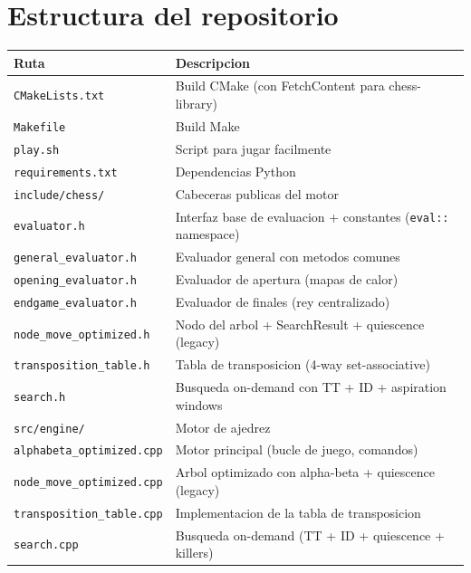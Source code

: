 \documentclass[11pt,a4paper]{article}
\begin{document}
\section{Estructura del repositorio}

\begin{center}
\small
\begin{tabularx}{\textwidth}{@{}l X@{}}
\toprule
\textbf{Ruta} & \textbf{Descripcion} \\
\midrule
\texttt{CMakeLists.txt} & Build CMake (con FetchContent para chess-library) \\
\texttt{Makefile} & Build Make \\
\texttt{play.sh} & Script para jugar facilmente \\
\texttt{requirements.txt} & Dependencias Python \\
\midrule
\texttt{include/chess/} & Cabeceras publicas del motor \\
\quad \texttt{evaluator.h} & Interfaz base de evaluacion + constantes (\texttt{eval::} namespace) \\
\quad \texttt{general\_evaluator.h} & Evaluador general con metodos comunes \\
\quad \texttt{opening\_evaluator.h} & Evaluador de apertura (mapas de calor) \\
\quad \texttt{endgame\_evaluator.h} & Evaluador de finales (rey centralizado) \\
\quad \texttt{node\_move\_optimized.h} & Nodo del arbol + SearchResult + quiescence (legacy) \\
\quad \texttt{transposition\_table.h} & Tabla de transposicion (4-way set-associative) \\
\quad \texttt{search.h} & Busqueda on-demand con TT + ID + aspiration windows \\
\midrule
\texttt{src/engine/} & Motor de ajedrez \\
\quad \texttt{alphabeta\_optimized.cpp} & Motor principal (bucle de juego, comandos) \\
\quad \texttt{node\_move\_optimized.cpp} & Arbol optimizado con alpha-beta + quiescence (legacy) \\
\quad \texttt{transposition\_table.cpp} & Implementacion de la tabla de transposicion \\
\quad \texttt{search.cpp} & Busqueda on-demand (TT + ID + quiescence + killers) \\

\end{tabularx}
\end{center}
\end{document}
